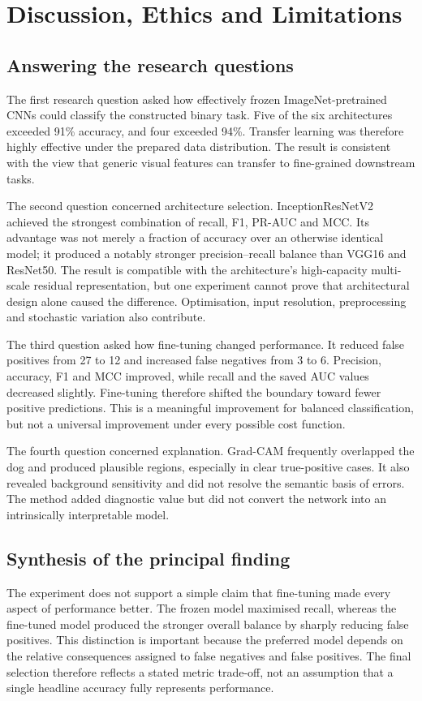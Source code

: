 \chapter{Discussion, Ethics and Limitations}
\label{chap:discussion}

\section{Answering the research questions}
The first research question asked how effectively frozen ImageNet-pretrained CNNs could classify the constructed binary task. Five of the six architectures exceeded 91\% accuracy, and four exceeded 94\%. Transfer learning was therefore highly effective under the prepared data distribution. The result is consistent with the view that generic visual features can transfer to fine-grained downstream tasks.

The second question concerned architecture selection. InceptionResNetV2 achieved the strongest combination of recall, F1, PR-AUC and MCC. Its advantage was not merely a fraction of accuracy over an otherwise identical model; it produced a notably stronger precision--recall balance than VGG16 and ResNet50. The result is compatible with the architecture's high-capacity multi-scale residual representation, but one experiment cannot prove that architectural design alone caused the difference. Optimisation, input resolution, preprocessing and stochastic variation also contribute.

The third question asked how fine-tuning changed performance. It reduced false positives from 27 to 12 and increased false negatives from 3 to 6. Precision, accuracy, F1 and MCC improved, while recall and the saved AUC values decreased slightly. Fine-tuning therefore shifted the boundary toward fewer positive predictions. This is a meaningful improvement for balanced classification, but not a universal improvement under every possible cost function.

The fourth question concerned explanation. Grad-CAM frequently overlapped the dog and produced plausible regions, especially in clear true-positive cases. It also revealed background sensitivity and did not resolve the semantic basis of errors. The method added diagnostic value but did not convert the network into an intrinsically interpretable model.


\section{Synthesis of the principal finding}
The experiment does not support a simple claim that fine-tuning made every aspect of performance better. The frozen model maximised recall, whereas the fine-tuned model produced the stronger overall balance by sharply reducing false positives. This distinction is important because the preferred model depends on the relative consequences assigned to false negatives and false positives. The final selection therefore reflects a stated metric trade-off, not an assumption that a single headline accuracy fully represents performance.

